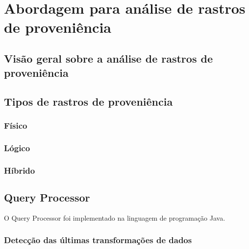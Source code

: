 
\chapter{Abordagem para análise de rastros de proveniência}%
\label{chap:rastros-de-proveniencia}


\section{Visão geral sobre a análise de rastros de proveniência}

 
\section{Tipos de rastros de proveniência}


\subsection{Físico}

\subsection{Lógico}

\subsection{Híbrido}


\section{Query Processor}

O Query Processor foi implementado na linguagem de programação Java.


\subsection{Detecção das últimas transformações de dados}

